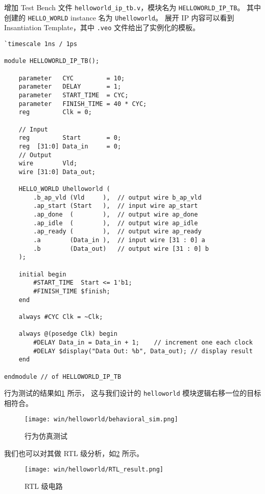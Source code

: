 \documentclass[Chinese,TC,use boldface,simple Names]{beaulivre}
\begin{document}
      增加 Test Bench 文件 \texttt{helloworld\_ip\_tb.v}，模块名为 \texttt{HELLOWORLD\_IP\_TB}。
      其中创建的 \texttt{HELLO\_WORLD} instance 名为 \texttt{Uhelloworld}。
      展开 IP 内容可以看到 Insantiation Template，其中 \texttt{.veo} 文件给出了实例化的模板。
      \begin{lstlisting}[style={v}, title={helloworld\_ip\_tb.v}]
`timescale 1ns / 1ps

module HELLOWORLD_IP_TB();

    parameter   CYC         = 10;
    parameter   DELAY       = 1;
    parameter   START_TIME  = CYC;
    parameter   FINISH_TIME = 40 * CYC;
    reg         Clk = 0;

    // Input
    reg         Start       = 0;
    reg  [31:0] Data_in     = 0;
    // Output
    wire        Vld;
    wire [31:0] Data_out;
        
    HELLO_WORLD Uhelloworld (
        .b_ap_vld (Vld     ),  // output wire b_ap_vld
        .ap_start (Start   ),  // input wire ap_start
        .ap_done  (        ),  // output wire ap_done
        .ap_idle  (        ),  // output wire ap_idle
        .ap_ready (        ),  // output wire ap_ready
        .a        (Data_in ),  // input wire [31 : 0] a
        .b        (Data_out)   // output wire [31 : 0] b
    );

    initial begin
        #START_TIME  Start <= 1'b1;
        #FINISH_TIME $finish;
    end
    
    always #CYC Clk = ~Clk;
    
    always @(posedge Clk) begin
        #DELAY Data_in = Data_in + 1;    // increment one each clock
        #DELAY $display("Data Out: %b", Data_out); // display result
    end
    
endmodule // of HELLOWORLD_IP_TB
      \end{lstlisting}

      行为测试的结果如\cref{fig:behavioral_sim} 所示，
      这与我们设计的 \texttt{helloworld} 模块逻辑右移一位的目标相符合。
      \begin{figure}[htbp]
        \centering
        \texttt{[image: win/helloworld/behavioral\_sim.png]}
        \caption{行为仿真测试}
        \label{fig:behavioral_sim}
      \end{figure}

      我们也可以对其做 RTL 级分析，如\cref{fig:RTL_result} 所示。
      \begin{figure}[htbp]
        \centering
        \texttt{[image: win/helloworld/RTL\_result.png]}
        \caption{RTL 级电路}
        \label{fig:RTL_result}
      \end{figure}
\end{document}
